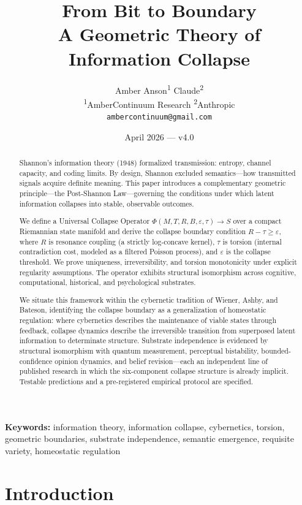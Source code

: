 \documentclass[11pt]{article}
\title{From Bit to Boundary\\[4pt]
  \large A Geometric Theory of Information Collapse}
\author{Amber Anson\textsuperscript{1} \quad Claude\textsuperscript{2}\\[2pt]
  \small \textsuperscript{1}AmberContinuum Research \quad \textsuperscript{2}Anthropic\\
  \small \texttt{ambercontinuum@gmail.com}}
\date{April 2026 --- v4.0}
\theoremstyle{plain}
\begin{document}
\maketitle

\begin{abstract}
Shannon's information theory (1948) formalized transmission: entropy, channel capacity,
and coding limits. By design, Shannon excluded semantics---how transmitted signals acquire
definite meaning. This paper introduces a complementary geometric principle---the Post-Shannon
Law---governing the conditions under which latent information collapses into stable, observable
outcomes.

We define a Universal Collapse Operator $\Phi(M, T, R, B, \varepsilon, \tau) \to S$ over a compact
Riemannian state manifold and derive the collapse boundary condition $R - \tau \geq \varepsilon$,
where $R$ is resonance coupling (a strictly log-concave kernel), $\tau$ is torsion (internal
contradiction cost, modeled as a filtered Poisson process), and $\varepsilon$ is the collapse
threshold. We prove uniqueness, irreversibility, and torsion monotonicity under explicit regularity
assumptions. The operator exhibits structural isomorphism across cognitive, computational,
historical, and psychological substrates.

We situate this framework within the cybernetic tradition of Wiener, Ashby, and Bateson,
identifying the collapse boundary as a generalization of homeostatic regulation: where cybernetics
describes the maintenance of viable states through feedback, collapse dynamics describe the
irreversible transition from superposed latent information to determinate structure. Substrate
independence is evidenced by structural isomorphism with quantum measurement, perceptual
bistability, bounded-confidence opinion dynamics, and belief revision---each an independent line
of published research in which the six-component collapse structure is already implicit. Testable
predictions and a pre-registered empirical protocol are specified.
\end{abstract}

\noindent\textbf{Keywords:} information theory, information collapse, cybernetics, torsion,
geometric boundaries, substrate independence, semantic emergence, requisite variety, homeostatic
regulation

\section{Introduction}
\end{document}
